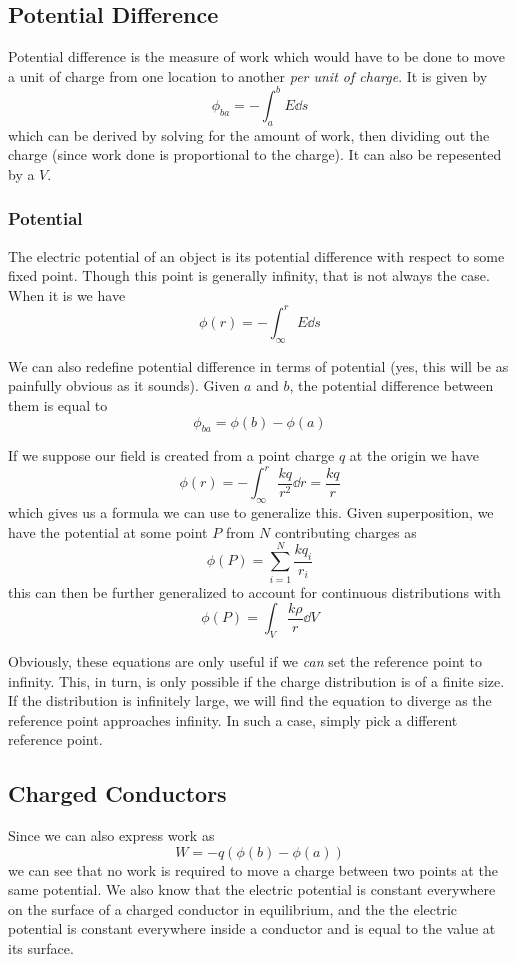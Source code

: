 \documentclass[12pt]{article}
\begin{document}
\subsection*{Potential Difference}
Potential difference is the measure of work which would have to be done to move a unit of charge from one location to another \emph{per unit of charge}. It is given by \[ \phi_{ba} = - \int_a^b E \dd s \] which can be derived by solving for the amount of work, then dividing out the charge (since work done is proportional to the charge). It can also be repesented by a $V$.

\subsubsection*{Potential}
The electric potential of an object is its potential difference with respect to some fixed point. Though this point is generally infinity, that is not always the case. When it is we have \[ \phi(r) = - \int_\infty^r E \dd s \]

We can also redefine potential difference in terms of potential (yes, this will be as painfully obvious as it sounds). Given $a$ and $b$, the potential difference between them is equal to \[ \phi_{ba} = \phi(b) - \phi(a) \]

If we suppose our field is created from a point charge $q$ at the origin we have \[ \phi(r) = - \int_\infty^r \frac{kq}{r^2} \dd r = \frac{kq}{r} \] which gives us a formula we can use to generalize this. Given superposition, we have the potential at some point $P$ from $N$ contributing charges as \[ \phi(P) = \sum_{i = 1}^N \frac{kq_i}{r_i} \] this can then be further generalized to account for continuous distributions with \[ \phi(P) = \int_V \frac{k \rho}{r} \dd V \]

Obviously, these equations are only useful if we \emph{can} set the reference point to infinity. This, in turn, is only possible if the charge distribution is of a finite size. If the distribution is infinitely large, we will find the equation to diverge as the reference point approaches infinity. In such a case, simply pick a different reference point.

\subsection*{Charged Conductors}
Since we can also express work as \[ W = -q(\phi(b) - \phi(a)) \] we can see that no work is required to move a charge between two points at the same potential. We also know that the electric potential is constant everywhere on the surface of a charged conductor in equilibrium, and the the electric potential is constant everywhere inside a conductor and is equal to the value at its surface.
\end{document}
